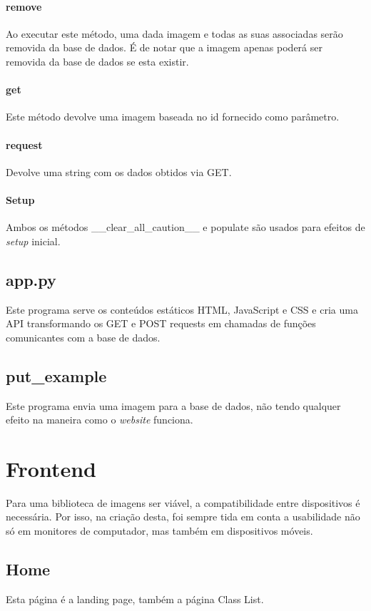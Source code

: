 \documentclass{report}
\begin{document}
\paragraph{remove}
Ao executar este método, uma dada imagem e todas as suas associadas serão removida da base de dados. É de notar que a imagem apenas poderá ser removida da base de dados se esta existir.

\paragraph{get}
Este método devolve uma imagem baseada no id fornecido como parâmetro. 

\paragraph{request}
Devolve uma string com os dados obtidos via GET.

\paragraph{Setup}
Ambos os métodos \_\_clear\_all\_caution\_\_ e  populate são usados para efeitos de \textit{setup} inicial.

\subsection{app.py}
Este programa serve os conteúdos estáticos HTML, JavaScript e CSS e cria uma API transformando os GET e POST requests em chamadas de funções comunicantes com a base de dados. 

\subsection{put\_example}
Este programa envia uma imagem para a base de dados, não tendo qualquer efeito na maneira como o \textit{website} funciona.

\section{Frontend}
Para uma biblioteca de imagens ser viável, a compatibilidade entre dispositivos é necessária. Por isso, na criação desta, foi sempre tida em conta a usabilidade não só em monitores de computador, mas também em dispositivos móveis. 

\subsection{Home}
Esta página é a landing page, também a página Class List.
\end{document}
